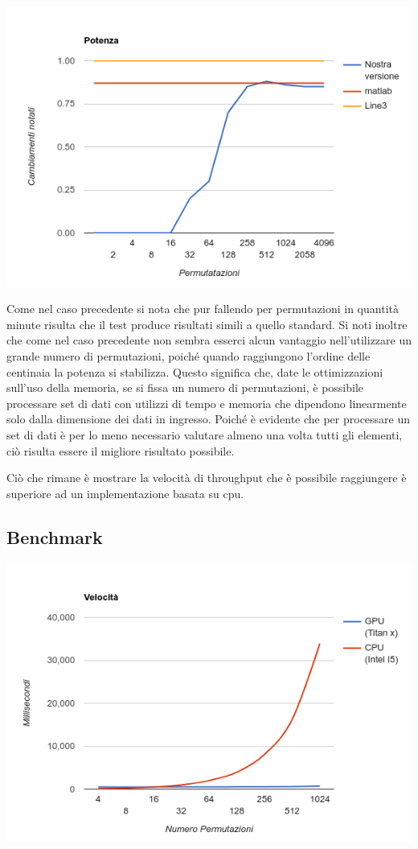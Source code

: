 \includegraphics[width=\linewidth]{potenza}

Come nel caso precedente si nota che pur fallendo per permutazioni in quantità minute risulta che il test produce risultati simili a quello standard. Si noti inoltre che come nel caso precedente non sembra esserci alcun vantaggio nell'utilizzare un grande numero di permutazioni, poiché quando raggiungono l'ordine delle centinaia la potenza si stabilizza. Questo significa che, date le ottimizzazioni sull'uso della memoria, se si fissa un numero di permutazioni, è possibile processare set di dati con utilizzi di tempo e memoria che dipendono linearmente solo dalla dimensione dei dati in ingresso. Poiché è evidente che per processare un set di dati è per lo meno necessario valutare almeno una volta tutti gli elementi, ciò risulta essere il migliore risultato possibile. 

Ciò che rimane è mostrare la velocità di throughput che è possibile raggiungere è superiore ad un implementazione basata su cpu.

\subsection{Benchmark}

\includegraphics[width=\linewidth]{confronto}

